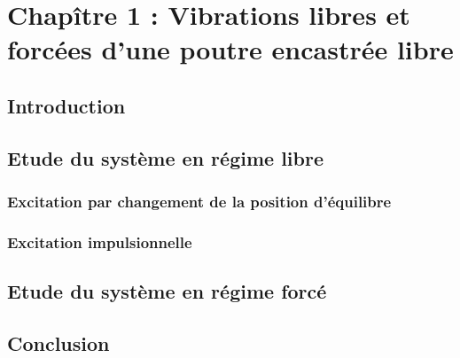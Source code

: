 \documentclass[10pt,a4paper, french]{article}
\begin{document}
\newpage


%



\section{Chapître 1 : Vibrations libres et forcées d'une poutre encastrée libre}

\subsection{Introduction}
\subsection{Etude du système en régime libre}
\subsubsection{Excitation par changement de la position d'équilibre}
\subsubsection{Excitation impulsionnelle}
\subsection{Etude du système en régime forcé}
\subsection{Conclusion}
\end{document}
